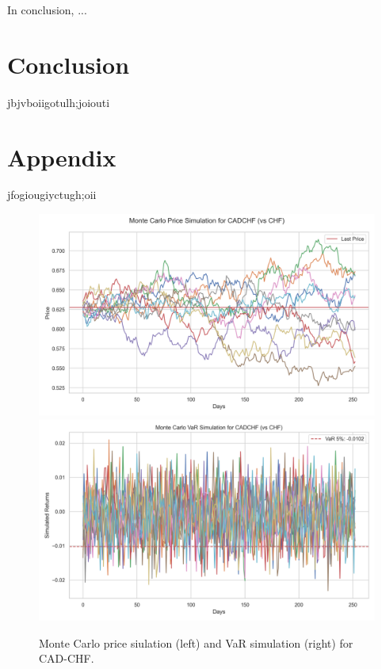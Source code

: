 \documentclass{article}
\begin{document}
In conclusion, ...

\section{Conclusion}
jbjvboiigotulh;joiouti
\section*{Appendix}
jfogiougiyctugh;oii
\begin{figure}[h]
    \centering  \includegraphics[width=0.48\linewidth]{reports/figures/monte_carlo_price_simulation_CADCHF_vs_CHF.png} \label{fig:monte_carlo_price_simulation_CADCHF_vs_CHF}
    \includegraphics[width=0.48\linewidth]{reports/figures/monte_carlo_var_simulation_CADCHF_vs_CHF.png} \label{fig:monte_carlo_var_simulation_CADCHF_vs_CHF}
    \caption{\footnotesize Monte Carlo price siulation (left) and VaR simulation (right) for CAD-CHF.}
\end{figure}
\printbibliography
\end{document}

